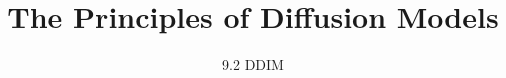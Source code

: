 
\title{The Principles of Diffusion Models}
\subtitle{9.2 DDIM}


\begin{frame}
    \titlepage
\end{frame}


